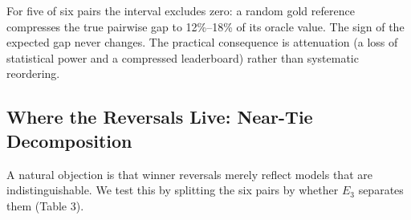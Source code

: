 \documentclass[11pt]{article}
\begin{document}
\begin{table}[htbp]
\centering
\footnotesize
\setlength{\tabcolsep}{3pt}
\caption{Evaluator Effect on Each Pairwise Gap (Uniform Reference; 24 Worlds; 5,000 Bootstrap Resamples)}
\end{table}
For five of six pairs the interval excludes zero: a random gold reference compresses the true pairwise gap to 12\%--18\% of its oracle value. The sign of the expected gap never changes. The practical consequence is attenuation (a loss of statistical power and a compressed leaderboard) rather than systematic reordering.

\subsection{Where the Reversals Live: Near-Tie Decomposition}
A natural objection is that winner reversals merely reflect models that are indistinguishable. We test this by splitting the six pairs by whether $E_3$ separates them (Table 3).
\end{document}
